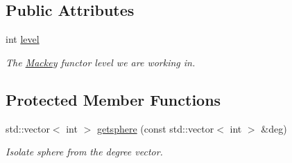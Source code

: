 \subsection*{Public Attributes}
\begin{DoxyCompactItemize}
\item 
int \hyperlink{classMackey_1_1MultiplicationTable_ad5a05c126e0b3c769fa9b1196a8db96a}{level}
\begin{DoxyCompactList}\small\item\em The \hyperlink{namespaceMackey}{Mackey} functor level we are working in. \end{DoxyCompactList}\end{DoxyCompactItemize}
\subsection*{Protected Member Functions}
\begin{DoxyCompactItemize}
\item 
std\+::vector$<$ int $>$ \hyperlink{classMackey_1_1MultiplicationTable_ad4245f4a8122f0661f969498ef53f999}{getsphere} (const std\+::vector$<$ int $>$ \&deg)
\begin{DoxyCompactList}\small\item\em Isolate sphere from the degree vector. \end{DoxyCompactList}\end{DoxyCompactItemize}
